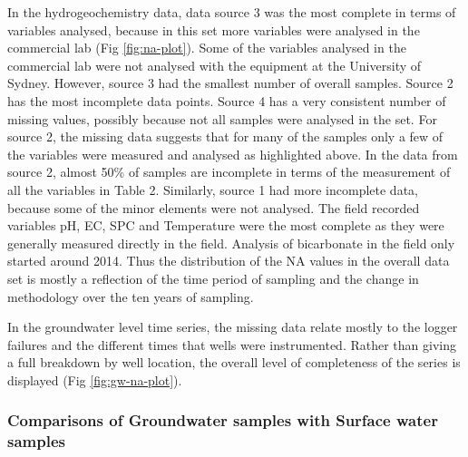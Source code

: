\documentclass[, manuscript]{copernicus}
\begin{document}
In the hydrogeochemistry data, data source 3 was the most complete in
terms of variables analysed, because in this set more variables were
analysed in the commercial lab (Fig \ref{fig:na-plot}). Some of the
variables analysed in the commercial lab were not analysed with the
equipment at the University of Sydney. However, source 3 had the
smallest number of overall samples. Source 2 has the most incomplete
data points. Source 4 has a very consistent number of missing values,
possibly because not all samples were analysed in the set. For source 2,
the missing data suggests that for many of the samples only a few of the
variables were measured and analysed as highlighted above. In the data
from source 2, almost 50\% of samples are incomplete in terms of the
measurement of all the variables in Table 2. Similarly, source 1 had
more incomplete data, because some of the minor elements were not
analysed. The field recorded variables pH, EC, SPC and Temperature were
the most complete as they were generally measured directly in the field.
Analysis of bicarbonate in the field only started around 2014. Thus the
distribution of the NA values in the overall data set is mostly a
reflection of the time period of sampling and the change in methodology
over the ten years of sampling.

In the groundwater level time series, the missing data relate mostly to
the logger failures and the different times that wells were
instrumented. Rather than giving a full breakdown by well location, the
overall level of completeness of the series is displayed (Fig
\ref{fig:gw-na-plot}).

\subsubsection{Comparisons of Groundwater samples with Surface water
samples}

\clearpage
\end{document}
